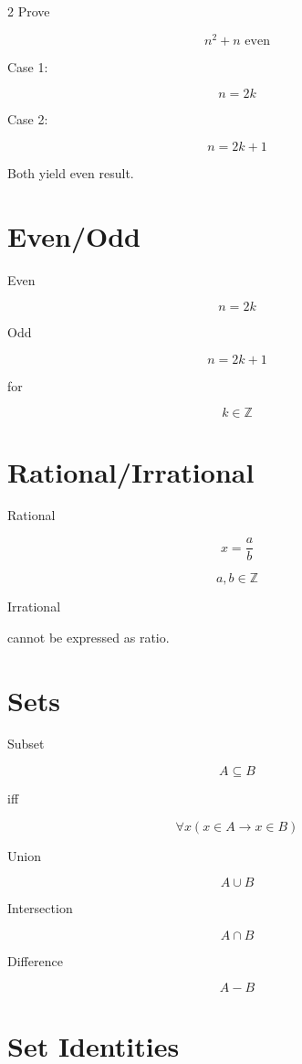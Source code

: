 \documentclass[9pt]{article}
\begin{document}
\begin{multicols}{2}
Prove

\[
n^2+n \text{ even}
\]

Case 1:

\[
n=2k
\]

Case 2:

\[
n=2k+1
\]

Both yield even result.

\section*{Even/Odd}

Even

\[
n=2k
\]

Odd

\[
n=2k+1
\]

for

\[
k\in \mathbb Z
\]

\section*{Rational/Irrational}

Rational

\[
x=\frac ab
\]

\[
a,b\in\mathbb Z
\]

Irrational

cannot be expressed as ratio.

\section*{Sets}

Subset

\[
A\subseteq B
\]

iff

\[
\forall x(x\in A\rightarrow x\in B)
\]

Union

\[
A\cup B
\]

Intersection

\[
A\cap B
\]

Difference

\[
A-B
\]

\section*{Set Identities}


\end{multicols}
\end{document}

